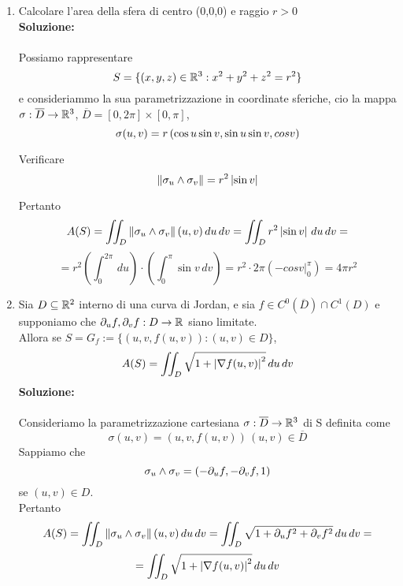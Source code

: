 \begin{example}
  \begin{enumerate}
    \item Calcolare l'area della sfera di centro (0,0,0) e raggio $r>0$ \\
          \textbf{Soluzione:} \\\\
          Possiamo rappresentare 
          $$S = \{(x,y,z)\in\mathbb{R}^3:x^2+y^2+z^2 = r^2\}$$
          e consideriammo la sua parametrizzazione in coordinate sferiche, cio\ace 
          la mappa $\sigma:\overline{D}\to\mathbb{R}^3$, $\overline{D}=[0,2\pi]\times[0,\pi]$, 
          $$\sigma(u,v) = r\left(\cos{u}\sin{v}, \sin{u}\sin{v}, \\cos{v}\right)$$
          \begin{exercise}
            Verificare $$\left\lVert\sigma_u\wedge\sigma_v\right\rVert = r^2\left\lvert \sin{v} \right\rvert$$
          \end{exercise}
          Pertanto 
          $$A(S) = \iint_{D} \left\lVert\sigma_u\wedge\sigma_v\right\rVert (u,v) \,du\,dv = \iint_{D} r^2\left\lvert \sin{v} \right\rvert \,du\,dv = $$
          $$= r^2\left(\int_{0}^{2\pi} \,du\right)\cdot\left(\int_{0}^{\pi}\sin{v} \,dv\right) = 
              r^2\cdot 2\pi \left(\left.-cos{v}\right|_{0}^{\pi}\right) = 4\pi r^2$$
    \item Sia $D\subseteq\mathbb{R}^2$ interno di una curva di Jordan, e sia 
          $f\in C^0(\overline{D})\cap C^1(D)$ e supponiamo che 
          $\partial_u f, \partial_v f : D \to \mathbb{R}$ siano limitate. \\
          Allora se $S = G_f := \{(u,v,f(u,v)):(u,v)\in D\}$, 
          $$A(S) = \iint_{D} \sqrt{1+\left\lvert \nabla f(u,v) \right\rvert^2} \,du \,dv$$
          \textbf{Soluzione:} \\\\
          Consideriamo la parametrizzazione cartesiana $\sigma : \overline{D}\to\mathbb{R}^3$ di S definita come
          $$\sigma(u,v)=(u,v,f(u,v)) \, (u,v)\in\overline{D}$$
          Sappiamo che 
          $$\sigma_u \wedge \sigma_v = \left(-\partial_u f, -\partial_v f, 1\right)$$
          se $(u,v)\in D$. \\
          Pertanto 
          $$A(S) = \iint_{D}\left\lVert\sigma_u\wedge\sigma_v\right\rVert(u,v)\,du\,dv = 
              \iint_{D} \sqrt{1+\partial_u f^2+\partial_v f^2} \,du\,dv = $$
          $$= \iint_{D} \sqrt{1+\left\lvert \nabla f(u,v) \right\rvert^2} \,du\,dv$$
  \end{enumerate}
\end{example}
